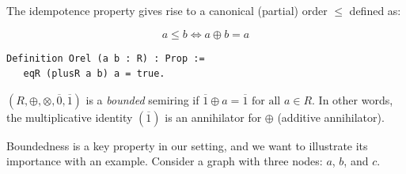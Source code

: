 \documentclass[a4paper,UKenglish,cleveref, autoref, thm-restate, anonymous]{lipics-v2021}
\begin{document}
\noindent
The idempotence property \cite{10.5555/1386688} gives rise to a canonical 
(partial) order $\leq$  defined as: 

  \begin{minipage}{0.40\linewidth}
   \[
        a \leq  b \iff a \oplus b = a
\] 
  \end{minipage}
  \hfill
  \begin{minipage}{0.55\linewidth}{\vspace{2mm}}
  \begin{lstlisting}[language=Coq]
  Definition Orel (a b : R) : Prop := 
   eqR (plusR a b) a = true.
    \end{lstlisting}
  \end{minipage}

\vspace{2mm}
\begin{definition}\label{def:bounded}
\((R, \oplus, \otimes, \overline{0}, \overline{1})\) is a \textit{bounded} \cite{10.5555/639508.639512}
semiring if $ \overline{1} \oplus a = \overline{1} \text{ for all } a \in R$. 
In other words, the multiplicative identity $(\overline{1})$ is 
an annihilator for $\oplus$ (additive annihilator).
\end{definition}


Boundedness is a key property in our setting, and we want to illustrate its importance with an example. Consider a graph with three nodes: $a$, $b$, and $c$. 

\begin{figure}[htb!]
    \centering

\end{figure}
\end{document}

